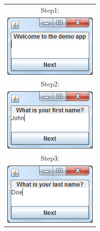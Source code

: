 \begin{figure}
\begin{minipage}{.3\linewidth}
        \begin{tabular}{c}
Step1:\\
\includegraphics[width=0.9\linewidth]{images/swing-demo-step1.png} \\[0.7cm] 
Step2:\\
\includegraphics[width=0.9\linewidth]{images/swing-demo-step2.png} \\[0.7cm]
Step3:\\
\includegraphics[width=0.9\linewidth]{images/swing-demo-step3.png} \\[0.7cm]

\end{tabular}
\end{minipage}
\end{figure}
